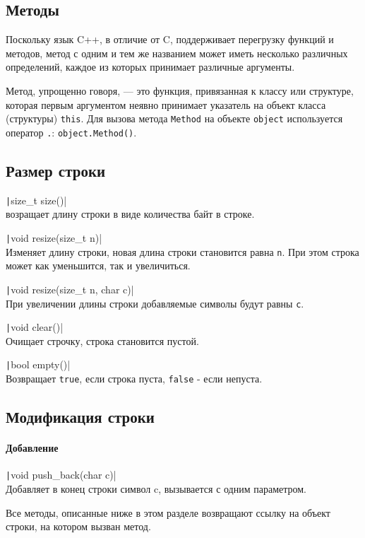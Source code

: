 \subsection{Методы}
Поскольку язык C++, в отличие от C, поддерживает перегрузку функций и методов,
метод с одним и тем же названием может иметь несколько различных определений,
каждое из которых принимает различные аргументы.

Метод, упрощенно говоря, --- это функция, привязанная к классу или структуре,
которая первым аргументом неявно принимает указатель на объект класса (структуры)
\verb|this|. Для вызова метода \verb|Method| на объекте \verb|object| используется
оператор \verb|.|: \verb|object.Method()|.


\subsection{Размер строки}
\texttt|size_t size()|\\
возращает длину строки в виде количества байт в строке.

\texttt|void resize(size_t n)| \\
Изменяет длину строки, новая длина строки становится равна \verb|n|. При этом строка может как уменьшится,
так и увеличиться.

\texttt|void resize(size_t n, char c)|\\
При увеличении длины строки добавляемые символы будут равны \verb|c|.

\texttt|void clear()|\\
Очищает строчку, строка становится пустой.

\texttt|bool empty()|\\
Возвращает \verb|true|, если строка пуста, \verb|false| - если непуста.

\subsection{Модификация строки}
\paragraph{Добавление}

\texttt|void push_back(char c)|\\
Добавляет в конец строки символ c, вызывается с одним параметром.

Все методы, описанные ниже в этом разделе возвращают ссылку на объект строки, на
котором вызван метод.

